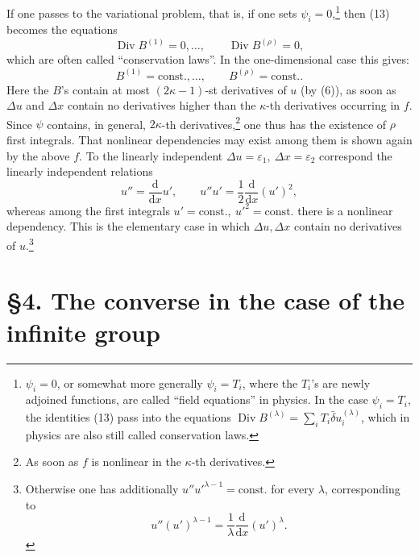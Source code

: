 \documentclass[11pt]{article}
\newcommand{\D}{\Delta}
\providecommand{\eps}{\varepsilon}
\providecommand{\dd}{\mathrm d}
\providecommand{\Div}{\operatorname{Div}}
\providecommand{\bd}{\bar{\delta}}
\begin{document}
If one passes to the variational problem, that is, if one sets \(\psi_i=0\),\footnote{\(\psi_i=0\), or somewhat more generally \(\psi_i=T_i\), where the \(T_i\)'s are newly adjoined functions, are called ``field equations'' in physics. In the case \(\psi_i=T_i\), the identities (13) pass into the equations \(\Div B^{(\lambda)}=\sum_i T_i\bd u_i^{(\lambda)}\), which in physics are also still called conservation laws.} then (13) becomes the equations
\[
\Div B^{(1)}=0,\ldots,\qquad \Div B^{(\rho)}=0,
\]
which are often called ``conservation laws''. In the one-dimensional case this gives:
\[
B^{(1)}=\mathrm{const.},\ldots,\qquad B^{(\rho)}=\mathrm{const.}.
\]
Here the \(B\)'s contain at most \((2\kappa-1)\)-st derivatives of \(u\) (by (6)), as soon as \(\D u\) and \(\D x\) contain no derivatives higher than the \(\kappa\)-th derivatives occurring in \(f\). Since \(\psi\) contains, in general, \(2\kappa\)-th derivatives,\footnote{As soon as \(f\) is nonlinear in the \(\kappa\)-th derivatives.} one thus has the existence of \(\rho\) first integrals. That nonlinear dependencies may exist among them is shown again by the above \(f\). To the linearly independent \(\D u=\eps_1,\ \D x=\eps_2\) correspond the linearly independent relations
\[
u''=\frac{\dd}{\dd x}u',\qquad
u''u'=\frac12\frac{\dd}{\dd x}(u')^2,
\]
whereas among the first integrals \(u'=\mathrm{const.},\ u'^2=\mathrm{const.}\) there is a nonlinear dependency. This is the elementary case in which \(\D u,\D x\) contain no derivatives of \(u\).\footnote{Otherwise one has additionally \(u''u'^{\lambda-1}=\mathrm{const.}\) for every \(\lambda\), corresponding to
\[
u''(u')^{\lambda-1}=\frac1\lambda\frac{\dd}{\dd x}(u')^\lambda.
\]}

\section*{\S{}4. The converse in the case of the infinite group}
\end{document}
